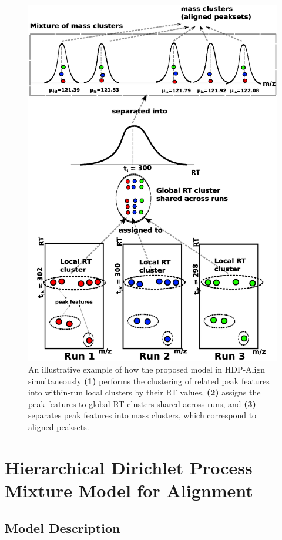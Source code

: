 \begin{figure}
\centering\includegraphics[width=0.8\columnwidth]{05-hdp/figures/figure_1.eps}
\centering\caption{An illustrative example of how the proposed model in HDP-Align simultaneously \textbf{(1)} performs the clustering of related peak features into within-run local clusters by their RT values, \textbf{(2)} assigns the peak features to global \ac{RT} clusters shared across runs, and \textbf{(3)} separates peak features into mass clusters, which correspond to aligned peaksets.\label{fig-hdp-cartoon}}
\end{figure}

\section{Hierarchical Dirichlet Process Mixture Model for Alignment}

\subsection{Model Description}

